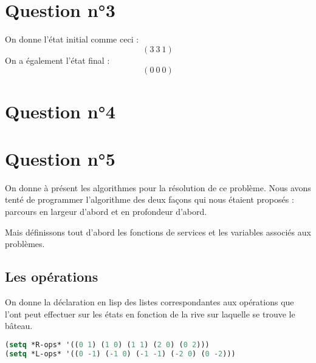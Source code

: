 \documentclass[a4paper, 12pt, leqno]{report}
\theoremstyle{plain}
\begin{document}
        \newpage
        \chapter{Question n°3} 
        On donne l'état initial comme ceci :
            \[(3\ 3\ 1)\]
            On a également l'état final :
            \[(0\ 0\ 0)\]
            
            \chapter{Question n°4}
            
             \chapter{Question n°5}
             On donne à présent les algorithmes pour la résolution de ce problème. Nous avons tenté de programmer l'algorithme des deux façons qui nous étaient proposés : parcours en largeur d'abord et en profondeur d'abord.
             
             Mais définissons tout d'abord les fonctions de services et les variables associés aux problèmes.
             
             \section{Les opérations}
             On donne la déclaration en lisp des listes correspondantes aux opérations que l'ont peut effectuer sur les états en fonction de la rive sur laquelle se trouve le bâteau.
             \begin{lstlisting}[label=some-code,caption=Déclaration des opérations ,language=lisp]
(setq *R-ops* '((0 1) (1 0) (1 1) (2 0) (0 2))) 
(setq *L-ops* '((0 -1) (-1 0) (-1 -1) (-2 0) (0 -2)))
            \end{lstlisting} 
\end{document}
